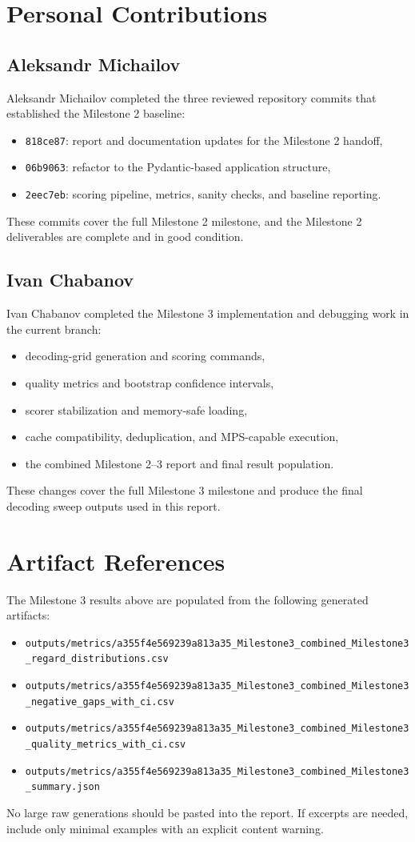 \documentclass[11pt]{article}
\begin{document}
\section{Personal Contributions}
\subsection*{Aleksandr Michailov}
Aleksandr Michailov completed the three reviewed repository commits that
established the Milestone 2 baseline:
\begin{itemize}
\item \texttt{818ce87}: report and documentation updates for the Milestone 2 handoff,
\item \texttt{06b9063}: refactor to the Pydantic-based application structure,
\item \texttt{2eec7eb}: scoring pipeline, metrics, sanity checks, and baseline reporting.
\end{itemize}
These commits cover the full Milestone 2 milestone, and the Milestone 2 deliverables are
complete and in good condition.

\subsection*{Ivan Chabanov}
Ivan Chabanov completed the Milestone 3 implementation and debugging work in the
current branch:
\begin{itemize}
\item decoding-grid generation and scoring commands,
\item quality metrics and bootstrap confidence intervals,
\item scorer stabilization and memory-safe loading,
\item cache compatibility, deduplication, and MPS-capable execution,
\item the combined Milestone 2--3 report and final result population.
\end{itemize}
These changes cover the full Milestone 3 milestone and produce the final decoding
sweep outputs used in this report.

\section{Artifact References}
The Milestone 3 results above are populated from the following generated artifacts:
\begin{itemize}
\item \texttt{outputs/metrics/a355f4e569239a813a35\_Milestone3\_combined\_Milestone3\_regard\_distributions.csv}
\item \texttt{outputs/metrics/a355f4e569239a813a35\_Milestone3\_combined\_Milestone3\_negative\_gaps\_with\_ci.csv}
\item \texttt{outputs/metrics/a355f4e569239a813a35\_Milestone3\_combined\_Milestone3\_quality\_metrics\_with\_ci.csv}
\item \texttt{outputs/metrics/a355f4e569239a813a35\_Milestone3\_combined\_Milestone3\_summary.json}
\end{itemize}

No large raw generations should be pasted into the report. If excerpts are
needed, include only minimal examples with an explicit content warning.
\end{document}

